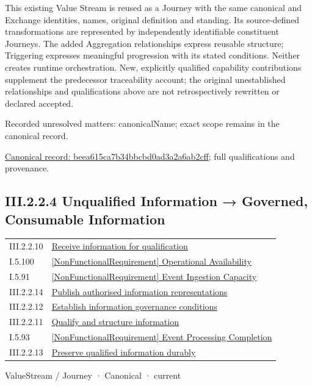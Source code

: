 This existing Value Stream is reused as a Journey with the same canonical and Exchange identities, names, original definition and standing. Its source-defined transformations are represented by independently identifiable constituent Journeys. The added Aggregation relationships express reusable structure; Triggering expresses meaningful progression with its stated conditions. Neither creates runtime orchestration. New, explicitly qualified capability contributions supplement the predecessor traceability account; the original unestablished relationships and qualifications above are not retrospectively rewritten or declared accepted.


{\small Recorded unresolved matters: canonicalName; exact scope remains in the canonical record.}\par
{\footnotesize \href{../../../../../../../continuum/strategy/value-stream/beea615ca7b34bbcbd0ad3a2a6ab2cff.md}{Canonical record: beea615ca7b34bbcbd0ad3a2a6ab2cff}; full qualifications and provenance.}\par
\subsection*{III.2.2.4 Unqualified Information → Governed, Consumable Information}
\label{navigation:III.2.2.4}

\begin{longtable}{p{.22\linewidth}p{.73\linewidth}}
III.2.2.10 & \hyperref[element:28544771580448638e209bb377a25fbe]{Receive information for qualification} \\
I.5.100 & \hyperref[element:65ac0367b7f241149ad1839032004039]{[NonFunctionalRequirement] Operational Availability} \\
I.5.91 & \hyperref[element:75420022c1a7463e91ca48f229a78194]{[NonFunctionalRequirement] Event Ingestion Capacity} \\
III.2.2.14 & \hyperref[element:91da459e860e4f359e440a65f0c94bcb]{Publish authorised information representations} \\
III.2.2.12 & \hyperref[element:ae90f7118fe245659f4524fc8991614d]{Establish information governance conditions} \\
III.2.2.11 & \hyperref[element:cbedc98406674727a9b1eae8d9bc30da]{Qualify and structure information} \\
I.5.93 & \hyperref[element:d1380eec700a492b810354e0798c8146]{[NonFunctionalRequirement] Event Processing Completion} \\
III.2.2.13 & \hyperref[element:e07ef0bcd9444af3a22ab45bbb3afc38]{Preserve qualified information durably} \\
\end{longtable}
\label{element:02e036f18bab400bac261007e39457ee}
{\small ValueStream / Journey · Canonical · current}\par

